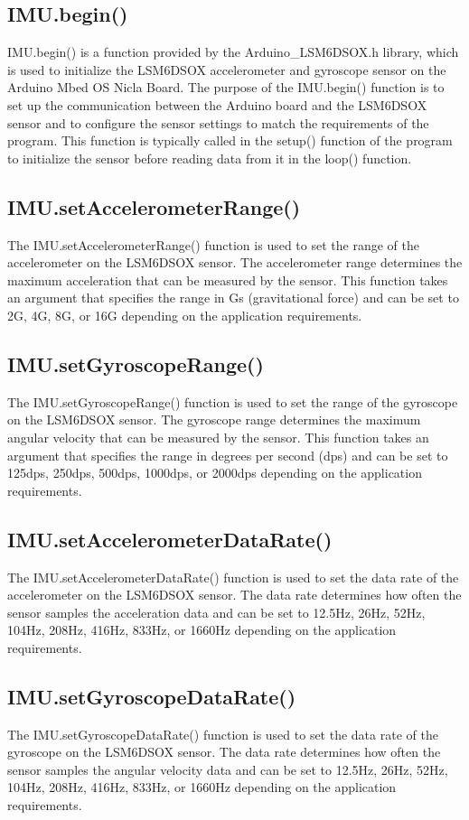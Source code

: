 \subsection{IMU.begin()}
IMU.begin() is a function provided by the Arduino\_LSM6DSOX.h library, which is used to initialize the LSM6DSOX accelerometer and gyroscope sensor on the Arduino Mbed OS Nicla Board. The purpose of the IMU.begin() function is to set up the communication between the Arduino board and the LSM6DSOX sensor and to configure the sensor settings to match the requirements of the program. This function is typically called in the setup() function of the program to initialize the sensor before reading data from it in the loop() function.

\subsection{IMU.setAccelerometerRange()}
The IMU.setAccelerometerRange() function is used to set the range of the accelerometer on the LSM6DSOX sensor. The accelerometer range determines the maximum acceleration that can be measured by the sensor. This function takes an argument that specifies the range in Gs (gravitational force) and can be set to 2G, 4G, 8G, or 16G depending on the application requirements.

\subsection{IMU.setGyroscopeRange()}
The IMU.setGyroscopeRange() function is used to set the range of the gyroscope on the LSM6DSOX sensor. The gyroscope range determines the maximum angular velocity that can be measured by the sensor. This function takes an argument that specifies the range in degrees per second (dps) and can be set to 125dps, 250dps, 500dps, 1000dps, or 2000dps depending on the application requirements.

\subsection{IMU.setAccelerometerDataRate()}
The IMU.setAccelerometerDataRate() function is used to set the data rate of the accelerometer on the LSM6DSOX sensor. The data rate determines how often the sensor samples the acceleration data and can be set to 12.5Hz, 26Hz, 52Hz, 104Hz, 208Hz, 416Hz, 833Hz, or 1660Hz depending on the application requirements.

\subsection{IMU.setGyroscopeDataRate()}
The IMU.setGyroscopeDataRate() function is used to set the data rate of the gyroscope on the LSM6DSOX sensor. The data rate determines how often the sensor samples the angular velocity data and can be set to 12.5Hz, 26Hz, 52Hz, 104Hz, 208Hz, 416Hz, 833Hz, or 1660Hz depending on the application requirements.

